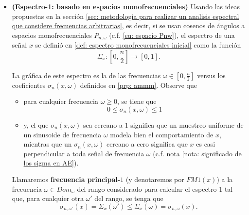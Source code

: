 \begin{itemize}
	\item \textbf{(Espectro-1: basado en espacios monofrecuenciales)} 
	Usando
	las ideas propuestas en 
	la sección
	\ref{sec: metodologia para realizar un analisis espectral que considere frecuencias arbitrarias}, 
	es decir, si se usan cosenos de ángulos a
	espacios monofrecuenciales $P_{n, \omega}$
	(c.f. \ref{eq: espacio Pnw}), el espectro
	de una señal $x$ se definió en
	\ref{def: espectro monofrecuenciales inicial}
	como la función 
	\[
	\Sigma_{x} : [0, \frac{n}{2}] \longrightarrow [0,1].
	\]
	
	La gráfica de este espectro es la de 
	las frecuencias $\omega \in [0, \frac{n}{2}]$ versus	
	los coeficientes
	$\sigma_{n}(x, \omega)$ definidos en 
	\ref{prp: ammm}. Observe que
	\begin{itemize}
		\item para cualquier frecuencia $\omega \geq 0$, se tiene que
		\[
		0 \leq \sigma_{n}(x, \omega) \leq 1
		\]
		\item 
	y, el que
	$\sigma_{n}(x, \omega)$ sea cercano a $1$ significa que un
	muestreo uniforme de un sinusoide de frecuencia $\omega$
	modela bien el comportamiento de $x$,
	mientras que un $\sigma_{n}(x, \omega)$ cercano
	a cero significa que 
	$x$ es casi perpendicular a toda señal de frecuencia $\omega$
	(c.f. nota \ref{nota: significado de los sigma en AE}).
	\end{itemize}
	\begin{defi}
	\label{def: FM1}
	Llamaremos \textbf{frecuencia principal-$1$}
	(y denotaremos
	por $FM1(x)$) a la frecuencia $\omega \in Dom_{\omega}$ 
	del rango considerado para calcular el espectro $1$
	tal que, para cualquier otra $\omega'$ del rango, se tenga que
	\[
	\sigma_{n, \omega'}(x) = \Sigma_{x}(\omega') 
	\leq \Sigma_{x}(\omega) = \sigma_{n, \omega}(x).
	\]
	\end{defi}
\end{itemize}

